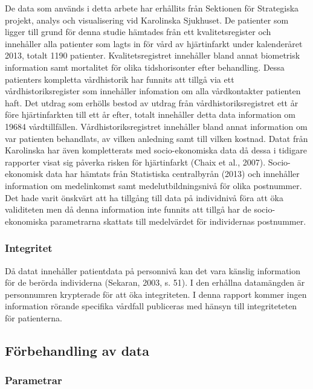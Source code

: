 De data som används i detta arbete har erhållits från Sektionen för Strategiska projekt, analys och visualisering vid Karolinska Sjukhuset. De patienter som ligger till grund för denna studie hämtades från ett kvalitetsregister och innehåller alla patienter som lagts in för vård av hjärtinfarkt under kalenderåret 2013, totalt 1190 patienter. Kvalitetsregistret innehåller bland annat biometrisk information samt mortalitet för olika tidshorisonter efter behandling. Dessa patienters kompletta vårdhistorik har funnits att tillgå via ett vårdhistoriksregister som innehåller infomation om alla vårdkontakter patienten haft. Det utdrag som erhölls bestod av utdrag från vårdhistoriksregistret ett år före hjärtinfarkten till ett år efter, totalt innehåller detta data information om 19684 vårdtillfällen. Vårdhistoriksregistret innehåller bland annat information om var patienten behandlats, av vilken anledning samt till vilken kostnad. Datat från Karolinska har även kompletterats med socio-ekonomiska data då dessa i tidigare rapporter visat sig påverka risken för hjärtinfarkt (Chaix et al., 2007). Socio-ekonomisk data har hämtats från Statistiska centralbyrån (2013) och innehåller information om medelinkomst samt medelutbildningsnivå för olika postnummer. Det hade varit önskvärt att ha tillgång till data på individnivå föra att öka validiteten men då denna information inte funnits att tillgå har de socio-ekonomiska parametrarna skattats till medelvärdet för individernas postnummer.

\subsubsection{Integritet}

Då datat innehåller patientdata på personnivå kan det vara känslig information för de berörda individerna (Sekaran, 2003, s. 51). I den erhållna datamängden är personnumren krypterade för att öka integriteten. I denna rapport kommer ingen information rörande specifika vårdfall publiceras med hänsyn till integriteteten för patienterna.

\subsection{Förbehandling av data}

\subsubsection{Parametrar}


